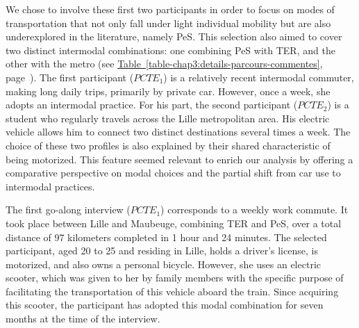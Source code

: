 \begin{refsegment}

We chose to involve these first two participants in order to focus on modes of transportation that not only fall under light individual mobility but are also underexplored in the literature, namely \acrshort{PeS}. This selection also aimed to cover two distinct intermodal combinations: one combining \acrshort{PeS} with \acrshort{TER}, and the other with the metro (see \hyperref[table-chap3:details-parcours-commentes]{Table~\ref{table-chap3:details-parcours-commentes}}, page~\pageref{table-chap3:details-parcours-commentes}). The first participant (\(PCTE_{1}\)) is a relatively recent intermodal commuter, making long daily trips, primarily by private car. However, once a week, she adopts an intermodal practice. For his part, the second participant (\(PCTE_{2}\)) is a student who regularly travels across the Lille metropolitan area. His electric vehicle allows him to connect two distinct destinations several times a week. The choice of these two profiles is also explained by their shared characteristic of being motorized. This feature seemed relevant to enrich our analysis by offering a comparative perspective on modal choices and the partial shift from car use to intermodal practices.%

The first go-along interview (\(PCTE_{1}\)) corresponds to a weekly work commute. It took place between Lille and Maubeuge, combining \acrshort{TER} and \acrshort{PeS}, over a total distance of 97 kilometers completed in 1 hour and 24 minutes. The selected participant, aged 20 to 25 and residing in Lille, holds a driver's license, is motorized, and also owns a personal bicycle. However, she uses an  electric scooter, which was given to her by family members with the specific purpose of facilitating the transportation of this vehicle aboard the train. Since acquiring this scooter, the participant has adopted this modal combination for seven months at the time of the interview.%


\end{refsegment}
